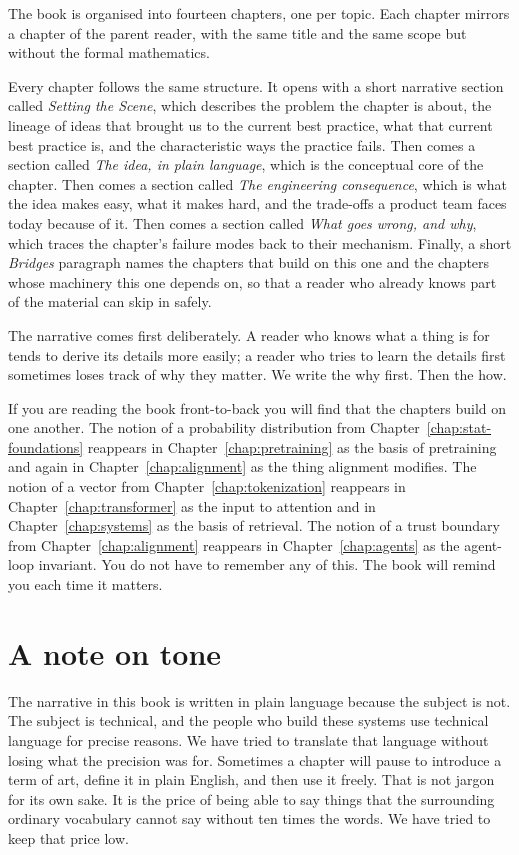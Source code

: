 The book is organised into fourteen chapters, one per topic. Each
chapter mirrors a chapter of the parent reader, with the same
title and the same scope but without the formal mathematics.

Every chapter follows the same structure. It opens with a short
narrative section called \emph{Setting the Scene}, which describes
the problem the chapter is about, the lineage of ideas that
brought us to the current best practice, what that current best
practice is, and the characteristic ways the practice fails. Then
comes a section called \emph{The idea, in plain language}, which
is the conceptual core of the chapter. Then comes a section called
\emph{The engineering consequence}, which is what the idea makes
easy, what it makes hard, and the trade-offs a product team faces
today because of it. Then comes a section called \emph{What goes
wrong, and why}, which traces the chapter's failure modes back to
their mechanism. Finally, a short \emph{Bridges} paragraph names
the chapters that build on this one and the chapters whose
machinery this one depends on, so that a reader who already knows
part of the material can skip in safely.

The narrative comes first deliberately. A reader who knows what a
thing is for tends to derive its details more easily; a reader
who tries to learn the details first sometimes loses track of why
they matter. We write the why first. Then the how.

If you are reading the book front-to-back you will find that the
chapters build on one another. The notion of a probability
distribution from Chapter~\ref{chap:stat-foundations} reappears in Chapter~\ref{chap:pretraining} as the basis
of pretraining and again in Chapter~\ref{chap:alignment} as the thing alignment
modifies. The notion of a vector from Chapter~\ref{chap:tokenization} reappears in
Chapter~\ref{chap:transformer} as the input to attention and in Chapter~\ref{chap:systems} as the
basis of retrieval. The notion of a trust boundary from
Chapter~\ref{chap:alignment} reappears in Chapter~\ref{chap:agents} as the agent-loop invariant.
You do not have to remember any of this. The book will remind
you each time it matters.

\section*{A note on tone}

The narrative in this book is written in plain language because
the subject is not. The subject is technical, and the people who
build these systems use technical language for precise reasons.
We have tried to translate that language without losing what the
precision was for. Sometimes a chapter will pause to introduce a
term of art, define it in plain English, and then use it freely.
That is not jargon for its own sake. It is the price of being
able to say things that the surrounding ordinary vocabulary
cannot say without ten times the words. We have tried to keep
that price low.

